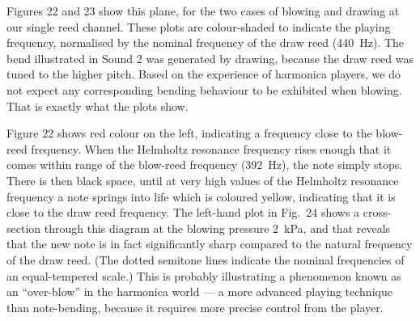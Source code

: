   Figures 22 and 23 show this plane, for the two cases of blowing and drawing 
  at our single reed channel. These plots are colour-shaded to indicate the 
  playing frequency, normalised by the nominal frequency of the draw reed 
  (440~Hz). The bend illustrated in Sound 2 was generated by drawing, because 
  the draw reed was tuned to the higher pitch. Based on the experience of 
  harmonica players, we do not expect any corresponding bending behaviour to be 
  exhibited when blowing. That is exactly what the plots show. 



  Figure 22 shows red colour on the left, indicating a frequency close to the 
  blow-reed frequency. When the Helmholtz resonance frequency rises enough that 
  it comes within range of the blow-reed frequency (392~Hz), the note simply 
  stops. There is then black space, until at very high values of the Helmholtz 
  resonance frequency a note springs into life which is coloured yellow, 
  indicating that it is close to the draw reed frequency. The left-hand plot in 
  Fig.\ 24 shows a cross-section through this diagram at the blowing pressure 
  2~kPa, and that reveals that the new note is in fact significantly sharp 
  compared to the natural frequency of the draw reed. (The dotted semitone 
  lines indicate the nominal frequencies of an equal-tempered scale.) This is 
  probably illustrating a phenomenon known as an “over-blow” in the harmonica 
  world — a more advanced playing technique than note-bending, because it 
  requires more precise control from the player. 



